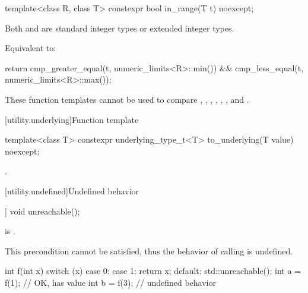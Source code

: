 %
\begin{itemdecl}
template<class R, class T>
  constexpr bool in_range(T t) noexcept;
\end{itemdecl}

\begin{itemdescr}
\pnum
\mandates
Both  and  are standard integer types or
extended integer types.

\pnum
\effects
Equivalent to:
\begin{codeblock}
return cmp_greater_equal(t, numeric_limits<R>::min()) &&
       cmp_less_equal(t, numeric_limits<R>::max());
\end{codeblock}
\end{itemdescr}

\pnum
\begin{note}
These function templates cannot be used to compare
,
,
,
,
,
, and
.
\end{note}

[utility.underlying]{Function template }

%
\begin{itemdecl}
template<class T>
  constexpr underlying_type_t<T> to_underlying(T value) noexcept;
\end{itemdecl}

\begin{itemdescr}
\pnum
\returns
{}.
\end{itemdescr}

[utility.undefined]{Undefined behavior}

%
\begin{itemdecl}
[[noreturn]] void unreachable();
\end{itemdecl}

\begin{itemdescr}
\pnum
\expects
{} is .
\begin{note}
This precondition cannot be satisfied, thus the behavior
of calling  is undefined.
\end{note}

\pnum
\begin{example}
\begin{codeblock}
int f(int x) {
  switch (x) {
  case 0:
  case 1:
    return x;
  default:
    std::unreachable();
  }
}
int a = f(1);           // OK,  has value 
int b = f(3);           // undefined behavior
\end{codeblock}
\end{example}
\end{itemdescr}

